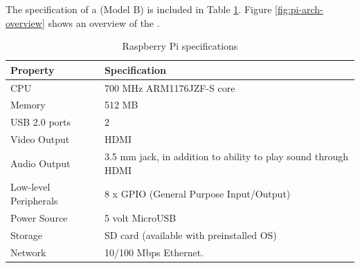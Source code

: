 The specification of a \rpi{} (Model B) is included in Table \ref{tab:pi-specs}. Figure \ref{fig:pi-arch-overview} shows an overview of the \rpi{}.        

\begin{table}[H]
\begin{tabular}{|p{6.0cm} | p{6.0cm} |}
\hline 
\textbf{Property} & \textbf{Specification} \\
\hline
CPU & 700 MHz ARM1176JZF-S core \\
\hline
Memory & 512 MB \\
\hline
USB 2.0 ports & 2 \\
\hline
Video Output & HDMI \\
\hline
Audio Output & 3.5 mm jack, in addition to ability to play sound through HDMI \\
\hline
Low-level Peripherals & 8 x GPIO (General Purpose Input/Output) \\
\hline
Power Source & 5 volt MicroUSB \\
\hline
Storage & SD card (available with preinstalled OS) \\
\hline
Network & 10/100 Mbps Ethernet.  \\
\hline
\end{tabular}
\caption{Raspberry Pi specifications}
\label{tab:pi-specs}
\end{table}


